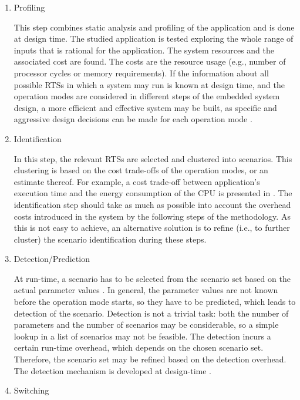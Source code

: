 \begin{enumerate}

\item Profiling 

This step combines static analysis and profiling of the application and is done at design time.
The studied application is tested exploring the whole range of inputs that is rational for the application.
The system resources and the associated cost are found.
The costs are the resource usage (e.g., number of processor cycles or memory requirements).
 If the information about all possible RTSs in which a system may run is known at design time, and the operation modes are considered in different steps of the embedded system design, a more efficient and effective system may be built, as specific and aggressive design decisions can be made for each operation mode \cite{Gheorghita2007}.

\item Identification

In this step, the relevant RTSs are selected and clustered into scenarios. 
This clustering is based on the cost trade-offs of the operation modes, or an estimate thereof.
For example, a cost trade-off between application's execution time and the energy consumption of the CPU is presented in \cite{Elena2010}.
The identification step should take as much as possible into account the overhead costs introduced in the system by the following steps of the methodology. 
As this is not easy to achieve, an alternative solution is to refine (i.e., to further cluster) the scenario identification during these steps. 

\item Detection/Prediction 

At run-time, a scenario has to be selected from the scenario set based on the actual parameter values \cite{GheoThesis}. 
In general, the parameter values are not known before the operation mode starts, so they have to be predicted, which leads to detection of the scenario. 
Detection is not a trivial task: both the number of parameters and the number of scenarios may be considerable, so a simple lookup in a list of scenarios may not be feasible. 
The detection incurs a certain run-time overhead, which depends on the chosen scenario set. 
Therefore, the scenario set may be refined based on the detection overhead. 
The detection mechanism is developed at design-time \cite{tcm}.

\item Switching


\end{enumerate}
